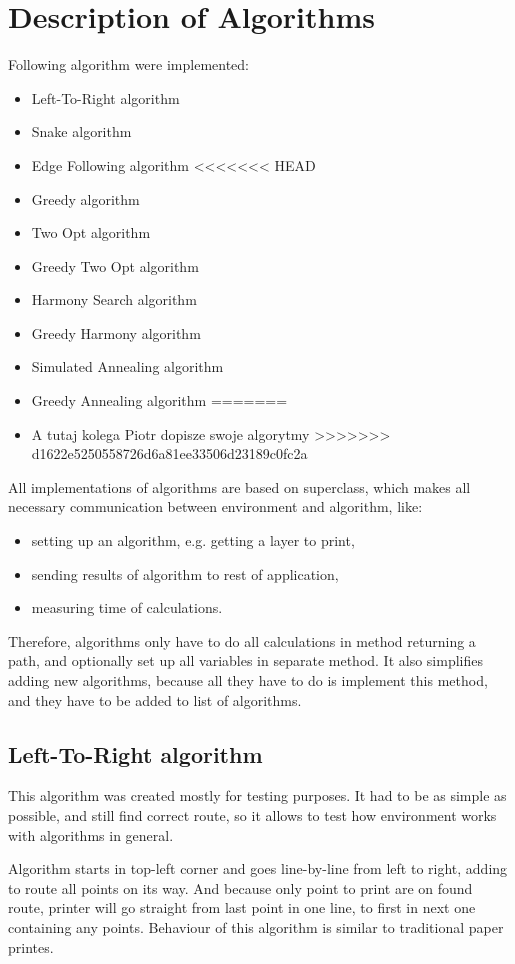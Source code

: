 \documentclass[titlepage]{article}
\begin{document}
\section{Description of Algorithms}
Following algorithm were implemented:
\begin{itemize}
\item Left-To-Right algorithm
\item Snake algorithm
\item Edge Following algorithm
<<<<<<< HEAD
\item Greedy algorithm
\item Two Opt algorithm
\item Greedy Two Opt algorithm
\item Harmony Search algorithm
\item Greedy Harmony algorithm
\item Simulated Annealing algorithm
\item Greedy Annealing algorithm
=======
\item A tutaj kolega Piotr dopisze swoje algorytmy
>>>>>>> d1622e5250558726d6a81ee33506d23189c0fc2a
\end{itemize}
All implementations of algorithms are based on superclass, which makes all necessary communication between environment and algorithm, like:
\begin{itemize}
\item setting up an algorithm, e.g. getting a layer to print,
\item sending results of algorithm to rest of application,
\item measuring time of calculations.
\end{itemize}
Therefore, algorithms only have to do all calculations in method returning a path, and optionally set up all variables in separate method. It also simplifies adding new algorithms, because all they have to do is implement this method, and they have to be added to list of algorithms.

\subsection{Left-To-Right algorithm}
This algorithm was created mostly for testing purposes. It had to be as simple as possible, and still find correct route, so it allows to test how environment works with algorithms in general.

Algorithm starts in top-left corner and goes line-by-line from left to right, adding to route all points on its way. And because only point to print are on found route, printer will go straight from last point in one line, to first in next one containing any points. Behaviour of this algorithm is similar to traditional paper printes.
\end{document}
